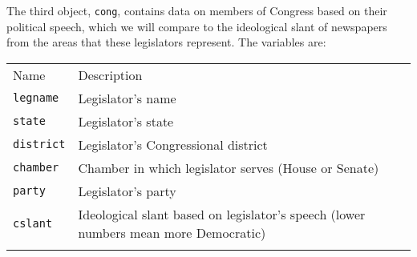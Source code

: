 \documentclass[]{article}
\begin{document}
The third object, \texttt{cong}, contains data on members of Congress
based on their political speech, which we will compare to the
ideological slant of newspapers from the areas that these legislators
represent. The variables are:

\begin{longtable}[c]{@{}ll@{}}
\toprule\addlinespace
\begin{minipage}[b]{0.35\columnwidth}\raggedright
Name
\end{minipage} & \begin{minipage}[b]{0.57\columnwidth}\raggedright
Description
\end{minipage}
\\\addlinespace
\midrule\endhead
\begin{minipage}[t]{0.35\columnwidth}\raggedright
\texttt{legname}
\end{minipage} & \begin{minipage}[t]{0.57\columnwidth}\raggedright
Legislator's name
\end{minipage}
\\\addlinespace
\begin{minipage}[t]{0.35\columnwidth}\raggedright
\texttt{state}
\end{minipage} & \begin{minipage}[t]{0.57\columnwidth}\raggedright
Legislator's state
\end{minipage}
\\\addlinespace
\begin{minipage}[t]{0.35\columnwidth}\raggedright
\texttt{district}
\end{minipage} & \begin{minipage}[t]{0.57\columnwidth}\raggedright
Legislator's Congressional district
\end{minipage}
\\\addlinespace
\begin{minipage}[t]{0.35\columnwidth}\raggedright
\texttt{chamber}
\end{minipage} & \begin{minipage}[t]{0.57\columnwidth}\raggedright
Chamber in which legislator serves (House or Senate)
\end{minipage}
\\\addlinespace
\begin{minipage}[t]{0.35\columnwidth}\raggedright
\texttt{party}
\end{minipage} & \begin{minipage}[t]{0.57\columnwidth}\raggedright
Legislator's party
\end{minipage}
\\\addlinespace
\begin{minipage}[t]{0.35\columnwidth}\raggedright
\texttt{cslant}
\end{minipage} & \begin{minipage}[t]{0.57\columnwidth}\raggedright
Ideological slant based on legislator's speech (lower numbers mean more
Democratic)
\end{minipage}
\\\addlinespace
\bottomrule
\end{longtable}
\end{document}
